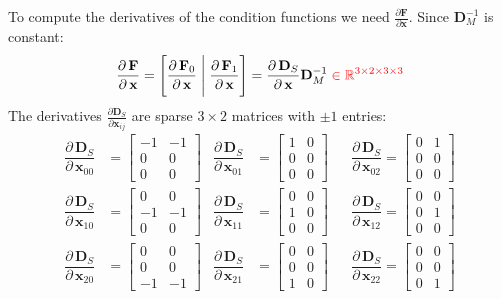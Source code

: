 \documentclass{article}
\newcommand{\pd}[2]{\dfrac{\partial\, #1}{\partial\, #2}}
\newcommand{\drop}[1]{\textcolor{red}{#1}}
\begin{document}
\noindent To compute the derivatives of the condition functions we need 
$\frac{\partial \mathbf{F}}{\partial \mathbf{x}}$. Since $\mathbf{D}_M^{-1}$ 
is constant:
\[
\pd{\mathbf{F}}{\mathbf{x}} = 
\left[ \pd{\mathbf{F}_0}{\mathbf{x}} \;\Bigg|\; \pd{\mathbf{F}_1}{\mathbf{x}} \right] = 
\pd{\mathbf{D}_S}{\mathbf{x}}\mathbf{D}_M ^{-1}
\; \drop{\in \mathbb{R}^{3 \times 2 \times 3 \times 3}}
\]
The derivatives $\frac{\partial \mathbf{D}_S}{\partial \mathbf{x}_{ij}}$ are sparse $3\times 2$ 
matrices with $\pm 1$ entries:
\begin{align*}
    \pd{\mathbf{D}_S}{\mathbf{x}_{00}} &= \begin{bmatrix} -1  &-1 \\  0  & 0 \\  0  & 0 \end{bmatrix} &
    \pd{\mathbf{D}_S}{\mathbf{x}_{01}} &= \begin{bmatrix}  1  & 0 \\  0  & 0 \\  0  & 0 \end{bmatrix} &&
    \pd{\mathbf{D}_S}{\mathbf{x}_{02}}  = \begin{bmatrix}  0  & 1 \\  0  & 0 \\  0  & 0 \end{bmatrix} \\[2ex]
    \pd{\mathbf{D}_S}{\mathbf{x}_{10}} &= \begin{bmatrix}  0  & 0 \\ -1  &-1 \\  0  & 0 \end{bmatrix} &
    \pd{\mathbf{D}_S}{\mathbf{x}_{11}} &= \begin{bmatrix}  0  & 0 \\  1  & 0 \\  0  & 0 \end{bmatrix} &&
    \pd{\mathbf{D}_S}{\mathbf{x}_{12}}  = \begin{bmatrix}  0  & 0 \\  0  & 1 \\  0  & 0 \end{bmatrix} \\[2ex]
    \pd{\mathbf{D}_S}{\mathbf{x}_{20}} &= \begin{bmatrix}  0  & 0 \\  0  & 0 \\ -1  &-1 \end{bmatrix} &
    \pd{\mathbf{D}_S}{\mathbf{x}_{21}} &= \begin{bmatrix}  0  & 0 \\  0  & 0 \\  1  & 0 \end{bmatrix} &&
    \pd{\mathbf{D}_S}{\mathbf{x}_{22}}  = \begin{bmatrix}  0  & 0 \\  0  & 0 \\  0  & 1 \end{bmatrix}
\end{align*}
\end{document}

